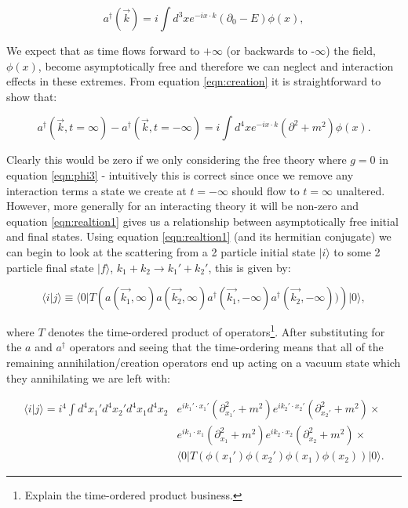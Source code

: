 	\begin{equation}
		a^\dagger(\vec{k}) = i\int d^3xe^{-ix\cdot k}(\partial_0 - E)\phi(x),
		\label{eqn:creation}
	\end{equation}

	We expect that as time flows forward to $+\infty$ (or backwards to -$\infty$) the field, $\phi(x)$, become asymptotically
	free and therefore we can neglect and interaction effects in these extremes.  From equation \eqref{eqn:creation} it is
	straightforward to show that:

	\begin{equation}
		a^\dagger(\vec{k}, t=\infty) - a^\dagger(\vec{k}, t=-\infty) = i\int d^4x e^{-ix\cdot k}(\partial^2 + m^2)\phi(x).
		\label{eqn:realtion1}
	\end{equation}

	Clearly this would be zero if we only considering the free theory where $g=0$ in equation \eqref{eqn:phi3} - intuitively this
	is correct since once we remove any interaction terms a state we create at $t=-\infty$ should flow to $t=\infty$ unaltered.
	However, more generally for an interacting theory it will be non-zero and equation \eqref{eqn:realtion1} gives us a relationship
	between asymptotically free initial and final states.  Using equation \eqref{eqn:realtion1} (and its hermitian conjugate) we can
	begin to look at the scattering from a 2 particle initial state $|i\rangle$ to some 2 particle final state $|f\rangle$,
	$k_1+k_2\rightarrow k_1'+k_2'$, this is given by:

	\begin{equation}
		\langle i|j\rangle\equiv\langle0|T\left(a(\vec{k_1}, \infty)a(\vec{k_2}, \infty)a^\dagger(\vec{k_1}, -\infty)a^\dagger(\vec{k_2}, -\infty))\right)|0\rangle,
	\end{equation}

	where $T$ denotes the time-ordered product of operators\footnote{Explain the time-ordered product business.}.  After substituting
	for the $a$ and $a^\dagger$ operators and seeing that the time-ordering means that all of the remaining annihilation/creation
	operators end up acting on a vacuum state which they annihilating we are left with:

	\begin{align*}
		\langle i|j\rangle = i^4\int d^4x_1'd^4x_2'd^4x_1d^4x_2&e^{ik_1'\cdot x_1'}(\partial^2_{x_1'} + m^2)
		e^{ik_2'\cdot x_2'}(\partial^2_{x_2'} + m^2)\times\\
		&e^{ik_1 \cdot x_1 }(\partial^2_{x_1 } + m^2)e^{ik_2 \cdot x_2 }(\partial^2_{x_2 } + m^2)\times\\
		&\langle0|T\left(\phi(x_1')\phi(x_2')\phi(x_1)\phi(x_2)\right)|0\rangle.
	\end{align*}

